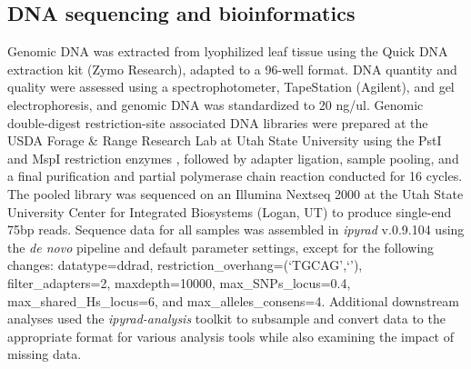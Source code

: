 \documentclass[11pt]{article}
\begin{document}
\subsection{DNA sequencing and bioinformatics}
Genomic DNA was extracted from lyophilized leaf tissue using the Quick DNA
extraction kit (Zymo Research), adapted to a 96-well format. 
DNA quantity and quality were assessed using a spectrophotometer, TapeStation 
(Agilent), and gel electrophoresis, and genomic DNA was standardized to 20 ng/ul. 
% 
Genomic double-digest restriction-site associated DNA \citep[ddRAD-seq;][]{peterson_double_2012}
libraries were prepared at the USDA Forage \& Range Research Lab at 
Utah State University using the PstI and MspI restriction enzymes
\citep{poland_development_2012},
followed by adapter ligation, sample pooling, and a final purification
and partial polymerase chain reaction conducted for 16 cycles. 
% 
The pooled library was sequenced on an Illumina Nextseq 2000 at the Utah State 
University Center for Integrated Biosystems (Logan, UT) to produce single-end
75bp reads. 
% 
Sequence data for all samples was assembled in \emph{ipyrad} 
v.0.9.104 \citep{eaton_ipyrad_2020} using the \emph{de novo} 
pipeline and default parameter settings, except for the following
changes: datatype=ddrad, restriction\_overhang=(`TGCAG',`'),
filter\_adapters=2, maxdepth=10000, max\_SNPs\_locus=0.4,
max\_shared\_Hs\_locus=6, and max\_alleles\_consens=4. 
% 
% 
Additional downstream analyses 
used 
the \emph{ipyrad-analysis} toolkit to subsample and convert data to the
appropriate format for various analysis tools while also examining the impact of
missing data.
\end{document}
